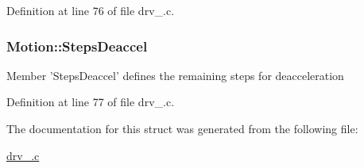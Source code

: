 Definition at line 76 of file drv\-\_.\-c.

\hypertarget{structMotion_a0d7942de8bba5304852a9f2d8fe833e5}{
\subsubsection[{Steps\-Deaccel}]{\setlength{\rightskip}{0pt plus 5cm}Motion\-::\-Steps\-Deaccel}}\label{structMotion_a0d7942de8bba5304852a9f2d8fe833e5}
Member 'Steps\-Deaccel' defines the remaining steps for deacceleration 

Definition at line 77 of file drv\-\_.\-c.



The documentation for this struct was generated from the following file\-:\begin{DoxyCompactItemize}
\item 
\hyperlink{drv__8825_8c}{drv\-\_.\-c}\end{DoxyCompactItemize}
